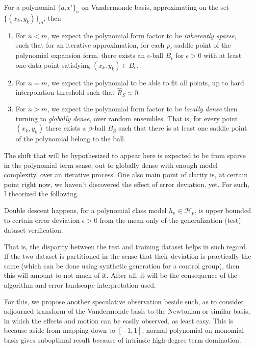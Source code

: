 \documentclass[10pt]{article} %
\begin{document}
\begin{hypothesis}
For a polynomial $\{a_{i}x^{i}\}_{n}$ on Vandermonde basis, approximating on the set $\{(x_{k},y_{k})\}_{m}$, then
\begin{enumerate}[topsep=1pt,itemsep=1pt]
  \item For $n<m$, we expect the polynomial form factor to be \textit{inherently sparse}, such that for an iterative approximation, for each $p_{i}$ saddle point of the polynomial expansion form, there exists an $\epsilon$-ball $B_{\epsilon}$ for $\epsilon>0$ with at least one data point satisfying $(x_{k},y_{k})\in B_{\epsilon}$. 
  \item For $n=m$, we expect the polynomial to be able to fit all points, up to hard interpolation threshold such that $\hat{R}_{S}\approx 0$. 
  \item For $n>m$, we expect the polynomial form factor to be \textit{locally dense} then turning to \textit{globally dense}, over random ensembles. That is, for every point $(x_{k},y_{k})$ there exists a $\beta$-ball $B_{\beta}$ such that there is at least one saddle point of the polynomial belong to the ball. 
\end{enumerate}
\end{hypothesis}

The shift that will be hypothesized to appear here is expected to be from sparse in the polynomial term sense, out to globally dense with enough model complexity, over an iterative process. One also main point of clarity is, at certain point right now, we haven't discovered the effect of error deviation, yet. For such, I theorized the following. 

\begin{conjecture}
  Double descent happens, for a polynomial class model $h_{n}\in\mathcal{H}_{p}$, is upper bounded to certain error deviation $\epsilon>0$ from the mean only of the generalization (test) dataset verification. 
\end{conjecture}

That is, the disparity between the test and training dataset helps in such regard. If the two dataset is partitioned in the sense that their deviation is practically the same (which can be done using synthetic generation for a control group), then this will amount to not much of it. After all, it will be the consequence of the algorithm and error landscape interpretation used. 

For this, we propose another speculative observation beside such, as to consider adjourned transform of the Vandermonde basis to the Newtonian or similar basis, in which the effects and motion can be easily observed, as least easy. This is because aside from mapping down to $[-1,1]$, normal polynomial on monomial basis gives suboptimal result because of intrinsic high-degree term domination. 
\end{document}
